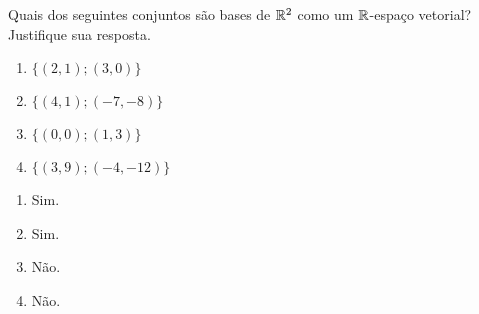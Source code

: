 \documentclass[12pt]{exam}
\begin{document}
    \begin{exercicio}
        Quais dos seguintes conjuntos são bases de $\mathbb{R}^2$ como um $\mathbb{R}$-espaço vetorial? Justifique sua resposta.
        \begin{multicols}{2}
            \begin{enumerate}[label={\alph*})]
                \item $\{(2, 1); (3, 0)\}$
            
                \item $\{(4, 1); (-7, -8)\}$
            
                \item $\{(0, 0); (1, 3)\}$
            
                \item $\{(3, 9); (-4, -12)\}$
            \end{enumerate}
        \end{multicols}
        \begin{solucao}
            \begin{enumerate}[label={\alph*})]
                \item Sim.

                \item Sim.

                \item Não.

                \item Não.
            \end{enumerate}
        \end{solucao}
    \end{exercicio}
\end{document}
